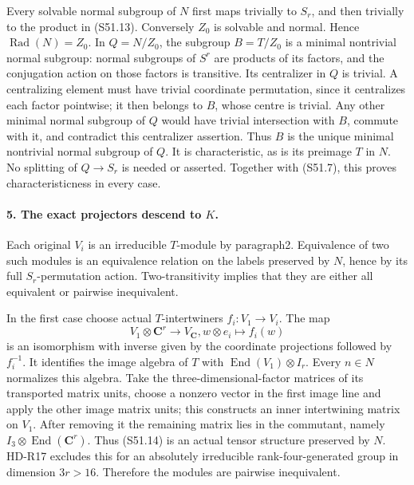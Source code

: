 Every solvable normal subgroup of \(N\) first maps trivially
to \(S_r\), and then trivially to the product in (S51.13).
Conversely \(Z_0\) is solvable and normal. Hence
\(\operatorname{Rad}(N)=Z_0\). In \(Q=N/Z_0\), the
subgroup \(B=T/Z_0\) is a minimal nontrivial normal subgroup:
normal subgroups of \(S^r\) are products of its factors,
and the conjugation action on those factors is transitive.
Its centralizer in \(Q\) is trivial. A centralizing element
must have trivial coordinate permutation, since it centralizes
each factor pointwise; it then belongs to \(B\), whose
centre is trivial. Any other minimal normal subgroup of \(Q\)
would have trivial intersection with \(B\), commute with it,
and contradict this centralizer assertion. Thus \(B\) is
the unique minimal nontrivial normal subgroup of \(Q\).
It is characteristic, as is its preimage \(T\) in \(N\).
No splitting of \(Q\to S_r\) is needed or asserted.
Together with (S51.7), this proves characteristicness in every case.

\paragraph{5. The exact projectors descend to \(K\).}
Each original \(V_i\) is an irreducible \(T\)-module by
paragraph2. Equivalence of two such modules is an equivalence
relation on the labels preserved by \(N\), hence by its
full \(S_r\)-permutation action. Two-transitivity implies
that they are either all equivalent or pairwise inequivalent.

In the first case choose actual \(T\)-intertwiners
\(f_i:V_1\to V_i\). The map
\[
 V_1\otimes\mathbf C^r\longrightarrow V_{\mathbf C},
       w\otimes e_i\longmapsto f_i(w)
                                                               \tag{S51.14}
\]
is an isomorphism with inverse given by the coordinate
projections followed by \(f_i^{-1}\). It identifies the
image algebra of \(T\) with \(\operatorname{End}(V_1)\otimes I_r\).
Every \(n\in N\) normalizes this algebra. Take the
three-dimensional-factor matrices of its transported matrix
units, choose a nonzero vector in the first image line and
apply the other image matrix units;
this constructs an inner intertwining matrix on \(V_1\).
After removing it the remaining matrix lies in the commutant,
namely \(I_3\otimes\operatorname{End}(\mathbf C^r)\).
Thus (S51.14) is an actual tensor structure preserved by \(N\).
HD-R17 excludes this for an absolutely irreducible rank-four-generated
group in dimension \(3r>16\). Therefore the modules are
pairwise inequivalent.

